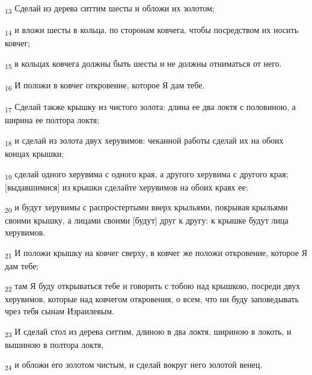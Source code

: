 \begin{tcolorbox}
\textsubscript{13} Сделай из дерева ситтим шесты и обложи их золотом;
\end{tcolorbox}
\begin{tcolorbox}
\textsubscript{14} и вложи шесты в кольца, по сторонам ковчега, чтобы посредством их носить ковчег;
\end{tcolorbox}
\begin{tcolorbox}
\textsubscript{15} в кольцах ковчега должны быть шесты и не должны отниматься от него.
\end{tcolorbox}
\begin{tcolorbox}
\textsubscript{16} И положи в ковчег откровение, которое Я дам тебе.
\end{tcolorbox}
\begin{tcolorbox}
\textsubscript{17} Сделай также крышку из чистого золота: длина ее два локтя с половиною, а ширина ее полтора локтя;
\end{tcolorbox}
\begin{tcolorbox}
\textsubscript{18} и сделай из золота двух херувимов: чеканной работы сделай их на обоих концах крышки;
\end{tcolorbox}
\begin{tcolorbox}
\textsubscript{19} сделай одного херувима с одного края, а другого херувима с другого края; [выдавшимися] из крышки сделайте херувимов на обоих краях ее;
\end{tcolorbox}
\begin{tcolorbox}
\textsubscript{20} и будут херувимы с распростертыми вверх крыльями, покрывая крыльями своими крышку, а лицами своими [будут] друг к другу: к крышке будут лица херувимов.
\end{tcolorbox}
\begin{tcolorbox}
\textsubscript{21} И положи крышку на ковчег сверху, в ковчег же положи откровение, которое Я дам тебе;
\end{tcolorbox}
\begin{tcolorbox}
\textsubscript{22} там Я буду открываться тебе и говорить с тобою над крышкою, посреди двух херувимов, которые над ковчегом откровения, о всем, что ни буду заповедывать чрез тебя сынам Израилевым.
\end{tcolorbox}
\begin{tcolorbox}
\textsubscript{23} И сделай стол из дерева ситтим, длиною в два локтя, шириною в локоть, и вышиною в полтора локтя,
\end{tcolorbox}
\begin{tcolorbox}
\textsubscript{24} и обложи его золотом чистым, и сделай вокруг него золотой венец.
\end{tcolorbox}
